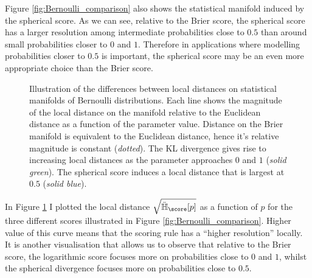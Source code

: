 Figure \ref{fig:Bernoulli_comparison} also shows the statistical manifold induced by the spherical score. As we can see, relative to the Brier score, the spherical score has a larger resolution among intermediate probabilities close to $0.5$ than around small probabilities closer to $0$ and $1$. Therefore in applications where modelling probabilities closer to $0.5$ is important, the spherical score may be an even more appropriate choice than the Brier score.

\begin{figure}[t]
	\begin{center}
	\end{center}
	\caption[Local distances on the statistical manifold of Bernoulli distributions]{Illustration of the differences between local distances on statistical manifolds of Bernoulli distributions. Each line shows the magnitude of the local distance on the manifold relative to the Euclidean distance as a function of the parameter value. Distance on the Brier manifold is equivalent to the Euclidean distance, hence it's relative magnitude is constant (\emph{dotted}). The KL divergence gives rise to increasing local distances as the parameter approaches $0$ and $1$ (\emph{solid green}). The spherical score induces a local distance that is largest at $0.5$ (\emph{solid blue}).\label{fig:Bernoulli_squareddistance}}
\end{figure}

In Figure \ref{fig:Bernoulli_squareddistance} I plotted the local distance $\sqrt{\ddot{\mathbb{H}}_{\score}[p]}$ as a function of $p$ for the three different scores illustrated in Figure \ref{fig:Bernoulli_comparison}. Higher value of this curve means that the scoring rule has a ``higher resolution'' locally. It is another visualisation that allows us to observe that relative to the Brier score, the logarithmic score focuses more on probabilities close to $0$ and $1$, whilst the spherical divergence focuses more on probabilities close to $0.5$.


